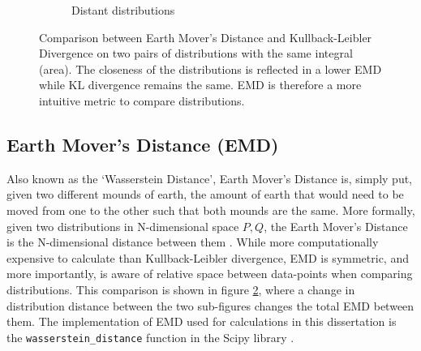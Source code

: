 \begin{figure}[h!]
\begin{subfigure}{.5\textwidth}
        \caption{Distant distributions}
        \label{fig:fardist}
    \end{subfigure}
    \caption[Comparison between Earth Mover's Distance and Kullback-Leibler Divergence]{Comparison between Earth Mover's Distance and Kullback-Leibler Divergence on two pairs of distributions with the same integral (area). The closeness of the distributions is reflected in a lower EMD while KL divergence remains the same. EMD is therefore a more intuitive metric to compare distributions.}
    \label{fig:distributioncompKLEMD}
\end{figure}

\FloatBarrier

\subsection{Earth Mover's Distance (EMD)}

Also known as the `Wasserstein Distance', Earth Mover's Distance is, simply put,
given two different mounds of earth, the amount of earth that would need to be
moved from one to the other such that both mounds are the same. More formally,
given two distributions in N-dimensional space $P, Q$, the Earth Mover's
Distance is the N-dimensional distance between them \autocite{pele_fast_2009}.
While more computationally expensive to calculate than Kullback-Leibler
divergence, EMD is symmetric, and more importantly, is aware of relative space
between data-points when comparing distributions. This comparison is shown in
figure \ref{fig:distributioncompKLEMD}, where a change in distribution distance
between the two sub-figures changes the total EMD between them. The
implementation of EMD used for calculations in this dissertation is the
\texttt{wasserstein\_distance} function in the Scipy library
\autocite{scipy_scipystatswasserstein_distance_2020}.